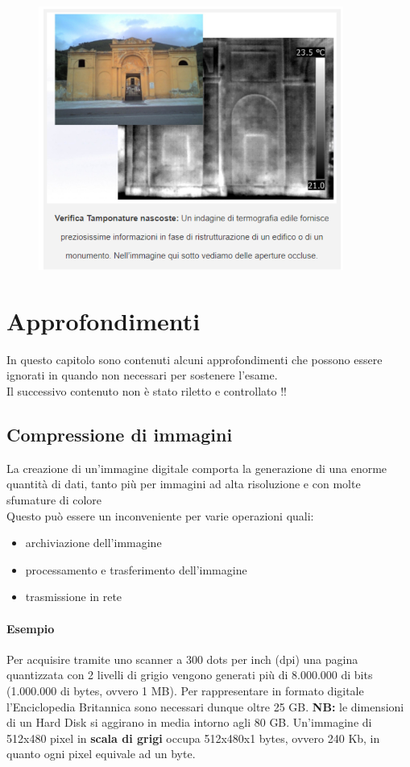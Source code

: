 \begin{figure}[H]
    \centering
    \includegraphics[width=10cm, keepaspectratio]{capitoli/immagini/imgs/termoesempio2.png}
\end{figure}

\chapter{Approfondimenti}
In questo capitolo sono contenuti alcuni approfondimenti che possono essere ignorati in quando non necessari per sostenere l'esame.\\

Il successivo contenuto non è stato riletto e controllato !!

\section{Compressione di immagini}

La creazione di un'immagine digitale comporta la generazione di
una enorme quantità di dati, tanto più per immagini ad alta risoluzione e con molte sfumature di colore
\\Questo può essere un inconveniente per varie operazioni quali:

\begin{itemize}
    \item archiviazione dell'immagine
    \item processamento e trasferimento dell'immagine
    \item trasmissione in rete
\end{itemize}

\subsubsection*{Esempio}
Per acquisire tramite uno scanner a 300 dots per inch (dpi) una pagina quantizzata con 2 livelli di grigio vengono generati più di
8.000.000 di bits (1.000.000 di bytes, ovvero 1 MB). Per rappresentare in formato digitale l'Enciclopedia Britannica sono necessari dunque oltre 25 GB.
\textbf{NB:} le dimensioni di un Hard Disk si aggirano in media intorno agli
80 GB. Un'immagine di 512x480 pixel in \textbf{scala di grigi} occupa 512x480x1
bytes, ovvero 240 Kb, in quanto ogni pixel equivale ad un byte.

